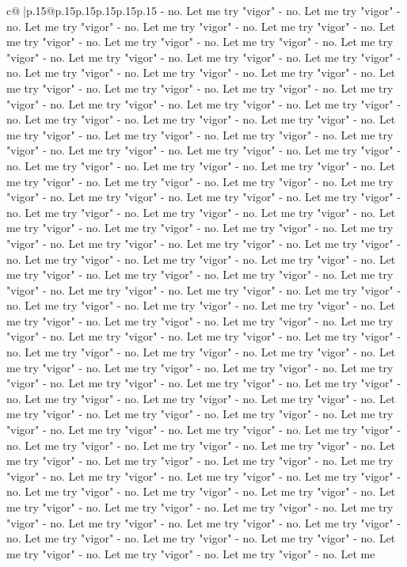\documentclass{article}
\begin{document}
{\begin{supertabular}{c@{$\;$}|p{.15\linewidth}@{}p{.15\linewidth}p{.15\linewidth}p{.15\linewidth}p{.15\linewidth}p{.15\linewidth}}
{{{{-} no. Let me try "vigor" {-} no. Let me try "vigor" {-} no. Let me try "vigor" {-} no. Let me try "vigor" {-} no. Let me try "vigor" {-} no. Let me try "vigor" {-} no. Let me try "vigor" {-} no. Let me try "vigor" {-} no. Let me try "vigor" {-} no. Let me try "vigor" {-} no. Let me try "vigor" {-} no. Let me try "vigor" {-} no. Let me try "vigor" {-} no. Let me try "vigor" {-} no. Let me try "vigor" {-} no. Let me try "vigor" {-} no. Let me try "vigor" {-} no. Let me try "vigor" {-} no. Let me try "vigor" {-} no. Let me try "vigor" {-} no. Let me try "vigor" {-} no. Let me try "vigor" {-} no. Let me try "vigor" {-} no. Let me try "vigor" {-} no. Let me try "vigor" {-} no. Let me try "vigor" {-} no. Let me try "vigor" {-} no. Let me try "vigor" {-} no. Let me try "vigor" {-} no. Let me try "vigor" {-} no. Let me try "vigor" {-} no. Let me try "vigor" {-} no. Let me try "vigor" {-} no. Let me try "vigor" {-} no. Let me try "vigor" {-} no. Let me try "vigor" {-} no. Let me try "vigor" {-} no. Let me try "vigor" {-} no. Let me try "vigor" {-} no. Let me try "vigor" {-} no. Let me try "vigor" {-} no. Let me try "vigor" {-} no. Let me try "vigor" {-} no. Let me try "vigor" {-} no. Let me try "vigor" {-} no. Let me try "vigor" {-} no. Let me try "vigor" {-} no. Let me try "vigor" {-} no. Let me try "vigor" {-} no. Let me try "vigor" {-} no. Let me try "vigor" {-} no. Let me try "vigor" {-} no. Let me try "vigor" {-} no. Let me try "vigor" {-} no. Let me try "vigor" {-} no. Let me try "vigor" {-} no. Let me try "vigor" {-} no. Let me try "vigor" {-} no. Let me try "vigor" {-} no. Let me try "vigor" {-} no. Let me try "vigor" {-} no. Let me try "vigor" {-} no. Let me try "vigor" {-} no. Let me try "vigor" {-} no. Let me try "vigor" {-} no. Let me try "vigor" {-} no. Let me try "vigor" {-} no. Let me try "vigor" {-} no. Let me try "vigor" {-} no. Let me try "vigor" {-} no. Let me try "vigor" {-} no. Let me try "vigor" {-} no. Let me try "vigor" {-} no. Let me try "vigor" {-} no. Let me try "vigor" {-} no. Let me try "vigor" {-} no. Let me try "vigor" {-} no. Let me try "vigor" {-} no. Let me try "vigor" {-} no. Let me try "vigor" {-} no. Let me try "vigor" {-} no. Let me try "vigor" {-} no. Let me try "vigor" {-} no. Let me try "vigor" {-} no. Let me try "vigor" {-} no. Let me try "vigor" {-} no. Let me try "vigor" {-} no. Let me try "vigor" {-} no. Let me try "vigor" {-} no. Let me try "vigor" {-} no. Let me try "vigor" {-} no. Let me try "vigor" {-} no. Let me try "vigor" {-} no. Let me try "vigor" {-} no. Let me try "vigor" {-} no. Let me try "vigor" {-} no. Let me try "vigor" {-} no. Let me try "vigor" {-} no. Let me try "vigor" {-} no. Let me try "vigor" {-} no. Let me try "vigor" {-} no. Let me try "vigor" {-} no. Let me try "vigor" {-} no. Let me try "vigor" {-} no. Let me try "vigor" {-} no. Let me try "vigor" {-} no. Let me try "vigor" {-} no. Let me try "vigor" {-} no. Let me try "vigor" {-} no. Let me try "vigor" {-} no. Let me try "vigor" {-} no. Let me try "vigor" {-} no. Let me try "vigor" {-} no. Let me try "vigor" {-} no. Let me try "vigor" {-} no. Let me try "vigor" {-} no. Let me try "vigor" {-} no. Let me try "vigor" {-} no. Let me }}}
\end{supertabular}}
\end{document}
